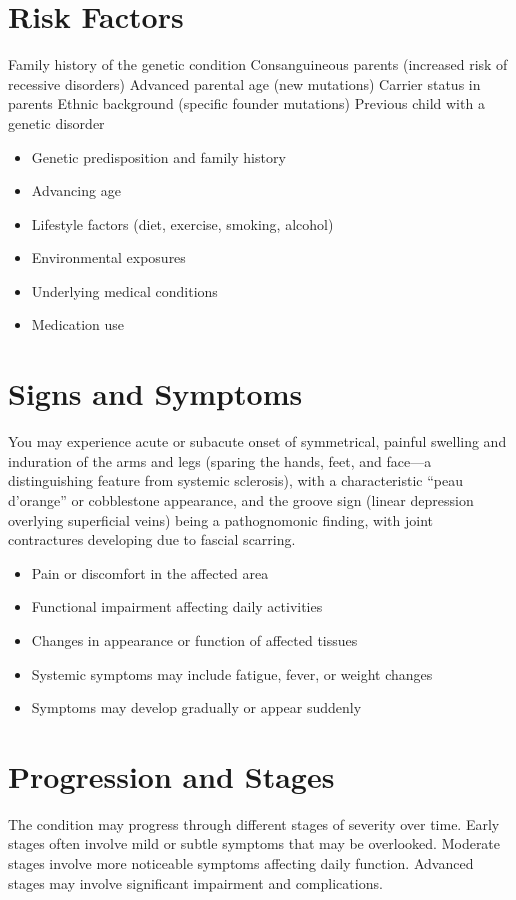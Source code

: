 \section{Risk Factors}
Family history of the genetic condition Consanguineous parents (increased risk of recessive disorders) Advanced parental age (new mutations) Carrier status in parents Ethnic background (specific founder mutations) Previous child with a genetic disorder

\begin{itemize}[noitemsep]
  \item Genetic predisposition and family history
  \item Advancing age
  \item Lifestyle factors (diet, exercise, smoking, alcohol)
  \item Environmental exposures
  \item Underlying medical conditions
  \item Medication use
\end{itemize}
\section{Signs and Symptoms}
You may experience acute or subacute onset of symmetrical, painful swelling and induration of the arms and legs (sparing the hands, feet, and face---a distinguishing feature from systemic sclerosis), with a characteristic ``peau d'orange'' or cobblestone appearance, and the groove sign (linear depression overlying superficial veins) being a pathognomonic finding, with joint contractures developing due to fascial scarring.

\begin{itemize}[noitemsep]
  \item Pain or discomfort in the affected area
  \item Functional impairment affecting daily activities
  \item Changes in appearance or function of affected tissues
  \item Systemic symptoms may include fatigue, fever, or weight changes
  \item Symptoms may develop gradually or appear suddenly
\end{itemize}
\section{Progression and Stages}
The condition may progress through different stages of severity over time. Early stages often involve mild or subtle symptoms that may be overlooked. Moderate stages involve more noticeable symptoms affecting daily function. Advanced stages may involve significant impairment and complications.
